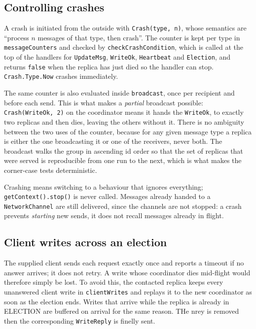 \subsection*{Controlling crashes}

A crash is initiated from the outside with \texttt{Crash(type, n)}, whose semantics are ``process $n$ messages of that type, then crash''. The counter is kept per type in \texttt{messageCounters} and checked by \texttt{checkCrashCondition}, which is called at the top of the handlers for \texttt{UpdateMsg}, \texttt{WriteOk}, \texttt{Heartbeat} and \texttt{Election}, and returns \texttt{false} when the replica has just died so the handler can stop. \texttt{Crash.Type.Now} crashes immediately.

The same counter is also evaluated inside \texttt{broadcast}, once per recipient and before each send. This is what makes a \emph{partial} broadcast possible: \texttt{Crash(WriteOk, 2)} on the coordinator means it hands the \texttt{WriteOk}, to exactly two replicas and then dies, leaving the others without it. There is no ambiguity between the two uses of the counter, because for any given message type a replica is either the one broadcasting it or one of the receivers, never both. The broadcast walks the group in ascending id order so that the set of replicas that were served is reproducible from one run to the next, which is what makes the corner-case tests deterministic.

Crashing means switching to a behaviour that ignores everything; \texttt{getContext().stop()} is never called. Messages already handed to a \texttt{NetworkChannel} are still delivered, since the channels are not stopped: a crash prevents \emph{starting} new sends, it does not recall messages already in flight.

\subsection*{Client writes across an election}

The supplied client sends each request exactly once and reports a timeout if no answer arrives; it does not retry. A write whose coordinator dies mid-flight would therefore simply be lost. To avoid this, the contacted replica keeps every unanswered client write in \texttt{clientWrites} and replays it to the new coordinator as soon as the election ends. Writes that arrive while the replica is already in ELECTION are buffered on arrival for the same reason. THe nrey is removed then the corresponding \texttt{WriteReply} is finelly sent.

